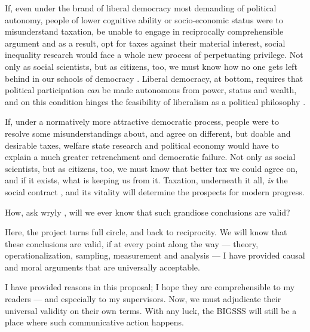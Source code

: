If, even under the brand of liberal democracy most demanding of political autonomy, people of lower cognitive ability or socio-economic status were to misunderstand taxation, be unable to engage in reciprocally comprehensible argument and as a result, opt for taxes against their material interest, social inequality research would face a whole new process of perpetuating privilege.
Not only as social scientists, but as citizens, too, we must know how no one gets left behind in our schools of democracy \citep{DeTocqueville1840,Rosenberg-2002-aa}.
Liberal democracy, at bottom, requires that political participation \emph{can} be made autonomous from power, status and wealth, and on this condition hinges the feasibility of liberalism as a political philosophy \citep[K1431]{GutmannThompson-2004-aa}.

If, under a normatively more attractive democratic process, people were to resolve some misunderstandings about, and agree on different, but doable and desirable taxes, welfare state research and political economy would have to explain a much greater retrenchment and democratic failure.
Not only as social scientists, but as citizens, too, we must know that better tax we could agree on, and if it exists, what is keeping us from it.
Taxation, underneath it all, \emph{is} the social contract \citep{SchumpeterSwedberg-1942-aa}, and its vitality will determine the prospects for modern progress.

How, ask wryly \citet[2]{PrzeworskiSalomon1995}, will we ever know that such grandiose conclusions are valid?

Here, the project turns full circle, and back to reciprocity.
We will know that these conclusions are valid, if at every point along the way --- theory, operationalization, sampling, measurement and analysis --- I have provided causal and moral arguments that are universally acceptable.

I have provided reasons in this proposal; I hope they are comprehensible to my readers --- and especially to my supervisors.
Now, we must adjudicate their universal validity on their own terms.
With any luck, the \gls{BIGSSS} will still be a place where such communicative action happens.

